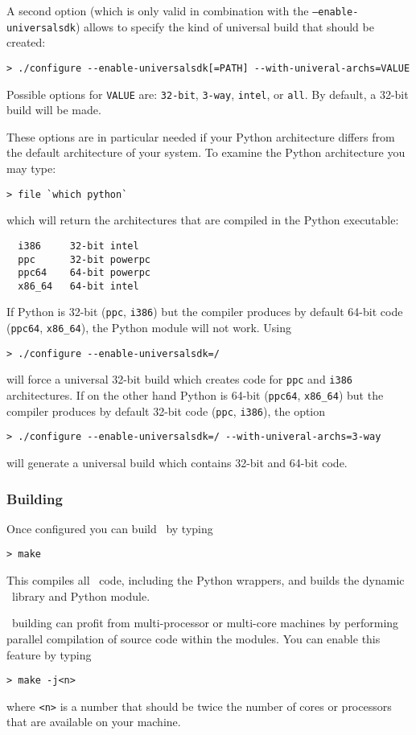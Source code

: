 \documentclass{article}[12pt,a4]
\begin{document}
A second option (which is only valid in combination with the {\tt --enable-universalsdk})
allows to specify the kind of universal build that should be created:
\begin{verbatim}
> ./configure --enable-universalsdk[=PATH] --with-univeral-archs=VALUE
\end{verbatim}
Possible options for {\tt VALUE} are: 
{\tt 32-bit},
{\tt 3-way},
{\tt intel}, or
{\tt all}.
By default, a 32-bit build will be made.

These options are in particular needed if your Python architecture differs
from the default architecture of your system.
To examine the Python architecture you may type:
\begin{verbatim}
> file `which python`
\end{verbatim}
which will return the architectures that are compiled in the Python executable:
\begin{verbatim}
  i386     32-bit intel
  ppc      32-bit powerpc
  ppc64    64-bit powerpc
  x86_64   64-bit intel
\end{verbatim}
If Python is 32-bit ({\tt ppc}, {\tt i386}) but the compiler produces by default
64-bit code ({\tt ppc64}, {\tt x86\_64}), the Python module will not work.
Using
\begin{verbatim}
> ./configure --enable-universalsdk=/
\end{verbatim}
will force a universal 32-bit build which creates code for {\tt ppc} and 
{\tt i386} architectures.
If on the other hand Python is 64-bit ({\tt ppc64}, {\tt x86\_64}) but the
compiler produces by default 32-bit code ({\tt ppc}, {\tt i386}), the option
\begin{verbatim}
> ./configure --enable-universalsdk=/ --with-univeral-archs=3-way
\end{verbatim}
will generate a universal build which contains 32-bit and 64-bit code.


\subsubsection{Building \this}

Once configured you can build \this\ by typing
\begin{verbatim}
> make
\end{verbatim}
This compiles all \this\ code, including the Python wrappers, and builds the dynamic \this\
library and Python module.

\this\ building can profit from multi-processor or multi-core machines by performing
parallel compilation of source code within the modules.
You can enable this feature by typing
\begin{verbatim}
> make -j<n>
\end{verbatim}
where {\tt <n>} is a number that should be twice the number of cores or processors that
are available on your machine.
\end{document}
